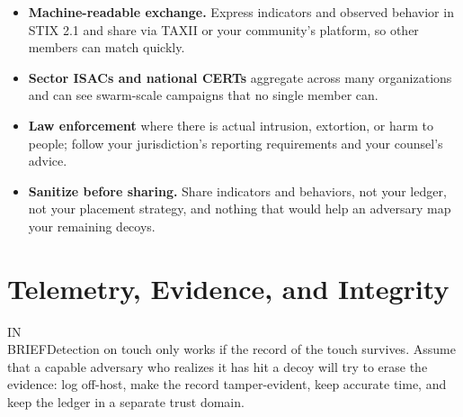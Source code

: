 \documentclass[11pt,letterpaper]{article}
\newcommand{\inbrief}[1]{\begin{inbriefbox}IN\\BRIEF\tcblower #1\end{inbriefbox}}
\begin{document}
\begin{itemize}
  \item \textbf{Machine-readable exchange.} Express indicators and observed behavior in STIX 2.1 and share via TAXII or your community's platform, so other members can match quickly.
  \item \textbf{Sector ISACs and national CERTs} aggregate across many organizations and can see swarm-scale campaigns that no single member can.
  \item \textbf{Law enforcement} where there is actual intrusion, extortion, or harm to people; follow your jurisdiction's reporting requirements and your counsel's advice.
  \item \textbf{Sanitize before sharing.} Share indicators and behaviors, not your ledger, not your placement strategy, and nothing that would help an adversary map your remaining decoys.
\end{itemize}

\section{Telemetry, Evidence, and Integrity}
\label{sec:telemetry}

\inbrief{Detection on touch only works if the record of the touch survives. Assume that a capable adversary who realizes it has hit a decoy will try to erase the evidence: log off-host, make the record tamper-evident, keep accurate time, and keep the ledger in a separate trust domain.}
\end{document}
